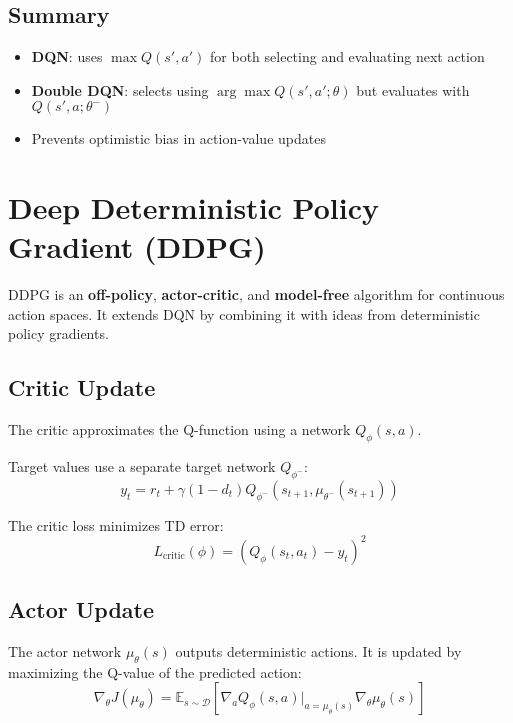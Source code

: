 \documentclass{article}
\begin{document}
\subsection{Summary}

\begin{itemize}
    \item \textbf{DQN}: uses $\max Q(s',a')$ for both selecting and evaluating next action
    \item \textbf{Double DQN}: selects using $\arg\max Q(s',a';\theta)$ but evaluates with $Q(s',a;\theta^-)$
    \item Prevents optimistic bias in action-value updates
\end{itemize}

\section{Deep Deterministic Policy Gradient (DDPG)}

DDPG is an \textbf{off-policy}, \textbf{actor-critic}, and \textbf{model-free} algorithm for continuous action spaces. It extends DQN by combining it with ideas from deterministic policy gradients.

\subsection{Critic Update}

The critic approximates the Q-function using a network $Q_\phi(s, a)$.

Target values use a separate target network $Q_{\phi^-}$:
\begin{equation}
    y_t = r_t + \gamma (1 - d_t) Q_{\phi^-}(s_{t+1}, \mu_{\theta^-}(s_{t+1}))
\end{equation}

The critic loss minimizes TD error:
\begin{equation}
    L_{\text{critic}}(\phi) = \left( Q_\phi(s_t, a_t) - y_t \right)^2
\end{equation}

\subsection{Actor Update}

The actor network $\mu_\theta(s)$ outputs deterministic actions. It is updated by maximizing the Q-value of the predicted action:
\begin{equation}
    \nabla_\theta J(\mu_\theta) = \mathbb{E}_{s \sim \mathcal{D}} \left[ \nabla_a Q_\phi(s, a)\vert_{a = \mu_\theta(s)} \nabla_\theta \mu_\theta(s) \right]
\end{equation}
\end{document}
